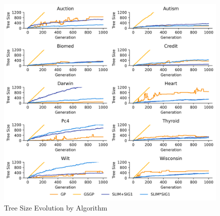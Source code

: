 
    \begin{figure}[h]
    \centering
    \includegraphics[width=\linewidth]{../Latex/Chapters/Figures/Results/comparison_tree_size_evolution.png}
    \caption{Tree Size Evolution by Algorithm}
    \label{fig:tree_size_evolution}
    \end{figure}
    